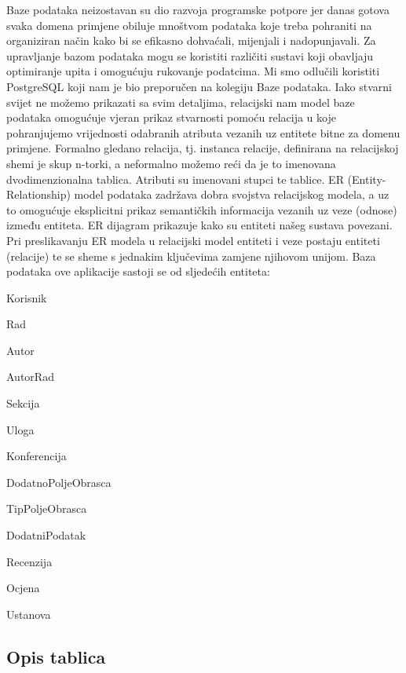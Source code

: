 			Baze podataka neizostavan su dio razvoja programske potpore jer danas gotova svaka domena primjene obiluje mnoštvom podataka koje treba pohraniti na organiziran način kako bi se efikasno dohvaćali, mijenjali i nadopunjavali. Za upravljanje bazom podataka mogu se koristiti različiti sustavi koji obavljaju optimiranje upita i omogućuju rukovanje podatcima. Mi smo odlučili koristiti PostgreSQL koji nam je bio preporučen na kolegiju Baze podataka. \newline Iako stvarni svijet ne možemo prikazati sa svim detaljima, relacijski nam model baze podataka omogućuje vjeran prikaz stvarnosti pomoću relacija u koje pohranjujemo vrijednosti odabranih atributa vezanih uz entitete bitne za domenu primjene. Formalno gledano relacija, tj. instanca relacije, definirana na relacijskoj shemi je skup n-torki, a neformalno možemo reći da je to imenovana dvodimenzionalna tablica. Atributi su imenovani stupci te tablice. ER (Entity-Relationship) model podataka zadržava dobra svojstva relacijskog modela, a uz to omogućuje eksplicitni prikaz semantičkih informacija vezanih uz veze (odnose) između entiteta. ER dijagram prikazuje kako su entiteti našeg sustava povezani. Pri preslikavanju ER modela u relacijski model entiteti i veze postaju entiteti (relacije) te se sheme s jednakim ključevima zamjene njihovom unijom.
		Baza podataka ove aplikacije sastoji se od sljedećih entiteta:
		\begin{packed_item}
			\item Korisnik
			\item Rad
			\item Autor
			\item AutorRad
			\item Sekcija
			\item Uloga
			\item Konferencija
			\item DodatnoPoljeObrasca
			\item TipPoljeObrasca
			\item DodatniPodatak 
			\item Recenzija
			\item Ocjena
			\item Ustanova
		\end{packed_item}
		
			\subsection{Opis tablica}
			

